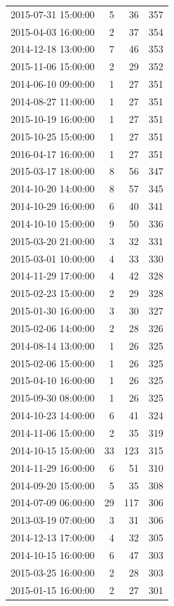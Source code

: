 \begin{tabular}{lrrr}
2015-07-31 15:00:00 & 5 & 36 & 357 \\
2015-04-03 16:00:00 & 2 & 37 & 354 \\
2014-12-18 13:00:00 & 7 & 46 & 353 \\
2015-11-06 15:00:00 & 2 & 29 & 352 \\
2014-06-10 09:00:00 & 1 & 27 & 351 \\
2014-08-27 11:00:00 & 1 & 27 & 351 \\
2015-10-19 16:00:00 & 1 & 27 & 351 \\
2015-10-25 15:00:00 & 1 & 27 & 351 \\
2016-04-17 16:00:00 & 1 & 27 & 351 \\
2015-03-17 18:00:00 & 8 & 56 & 347 \\
2014-10-20 14:00:00 & 8 & 57 & 345 \\
2014-10-29 16:00:00 & 6 & 40 & 341 \\
2014-10-10 15:00:00 & 9 & 50 & 336 \\
2015-03-20 21:00:00 & 3 & 32 & 331 \\
2015-03-01 10:00:00 & 4 & 33 & 330 \\
2014-11-29 17:00:00 & 4 & 42 & 328 \\
2015-02-23 15:00:00 & 2 & 29 & 328 \\
2015-01-30 16:00:00 & 3 & 30 & 327 \\
2015-02-06 14:00:00 & 2 & 28 & 326 \\
2014-08-14 13:00:00 & 1 & 26 & 325 \\
2015-02-06 15:00:00 & 1 & 26 & 325 \\
2015-04-10 16:00:00 & 1 & 26 & 325 \\
2015-09-30 08:00:00 & 1 & 26 & 325 \\
2014-10-23 14:00:00 & 6 & 41 & 324 \\
2014-11-06 15:00:00 & 2 & 35 & 319 \\
2014-10-15 15:00:00 & 33 & 123 & 315 \\
2014-11-29 16:00:00 & 6 & 51 & 310 \\
2014-09-20 15:00:00 & 5 & 35 & 308 \\
2014-07-09 06:00:00 & 29 & 117 & 306 \\
2013-03-19 07:00:00 & 3 & 31 & 306 \\
2014-12-13 17:00:00 & 4 & 32 & 305 \\
2014-10-15 16:00:00 & 6 & 47 & 303 \\
2015-03-25 16:00:00 & 2 & 28 & 303 \\
2015-01-15 16:00:00 & 2 & 27 & 301 \\

\end{tabular}
